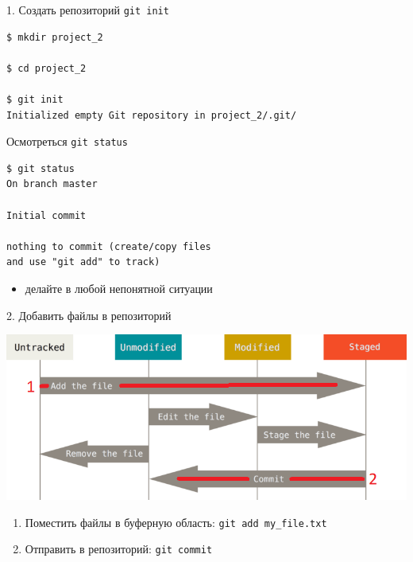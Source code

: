 \documentclass[presentation]{beamer}
\begin{document}
\begin{frame}[fragile,label={sec:org67157dc}]{1. Создать репозиторий}
 \alert{\texttt{git init}}

\begin{verbatim}
$ mkdir project_2

$ cd project_2

$ git init
Initialized empty Git repository in project_2/.git/
\end{verbatim}
\end{frame}

\begin{frame}[fragile,label={sec:org0bcf2e5}]{ Осмотреться}
 \alert{\texttt{git status}}

\begin{verbatim}
$ git status
On branch master

Initial commit

nothing to commit (create/copy files 
and use "git add" to track)
\end{verbatim}

\begin{itemize}
\item делайте в любой непонятной ситуации
\end{itemize}
\end{frame}

\begin{frame}[fragile,label={sec:org754cf3e}]{2. Добавить файлы в репозиторий}
 \begin{center}
\includegraphics[height=0.5\textheight]{./01_vcs_01_git_file_states_01_add.png}
\end{center}

\begin{enumerate}
\item Поместить файлы в буферную область: \texttt{git add my\_file.txt}
\item Отправить в репозиторий: \texttt{git commit}
\end{enumerate}
\end{frame}
\end{document}
